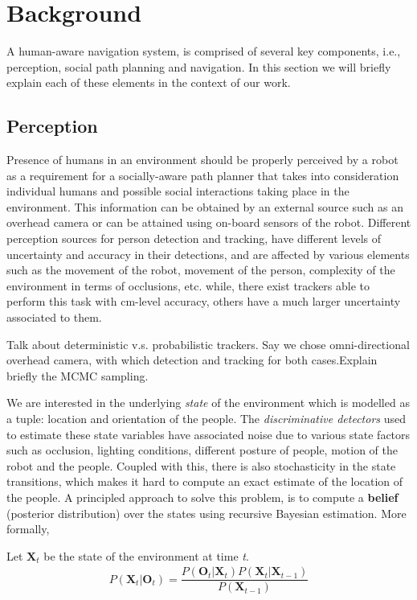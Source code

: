\section{Background}
\label{sec:background}
A human-aware navigation system, is comprised of several key components, i.e., perception, social path planning and navigation. In this section we will briefly explain each of these elements in the context of our work.

\subsection{Perception}

Presence of humans in an environment should be properly perceived by a robot as a requirement for a socially-aware path planner that takes into consideration individual humans and possible social interactions taking place in the environment. This information can be obtained by an external source such as an overhead camera or can be attained using on-board sensors of the robot. Different perception sources for person detection and tracking, have different levels of uncertainty and accuracy in their detections, and are affected by various elements such as the movement of the robot, movement of the person, complexity of the environment in terms of occlusions, etc. while, there exist trackers able to perform this task with cm-level accuracy, others have a much larger uncertainty associated to them. 

Talk about deterministic v.s. probabilistic trackers. 
Say we chose omni-directional overhead camera, with which detection and tracking for both cases.Explain briefly the MCMC sampling.

We are interested in the underlying \textit{state} of the environment which is modelled as a tuple: location and orientation of the people. The \textit{discriminative detectors} used to estimate these state variables have associated noise due to various state factors such as occlusion, lighting conditions, different posture of people, motion of the robot and the people. Coupled with this, there is also stochasticity in the state transitions, which makes it hard to compute an exact estimate of the location of the people. A principled approach to solve this problem, is to compute a \textbf{belief} (posterior distribution) over the states using recursive Bayesian estimation. More formally,

Let $\textbf{X}_{t}$ be the state of the environment at time \textit{t}.
\begin{align}
P(\textbf{X}_{t} | \textbf{O}_{t}) = \dfrac{P(\textbf{O}_{t} | \textbf{X}_{t}) P(\textbf{X}_{t}|\textbf{X}_{t-1})} {P(\textbf{X}_{t-1})}
\end{align} 

